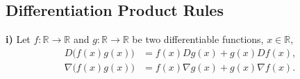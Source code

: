 \documentclass[12pt,thmsa]{article}
\begin{document}
\begin{itemize}
\end{itemize}


\subsection{Differentiation Product Rules}

\textbf{i)} Let \(f: \mathbb{R} \rightarrow \mathbb{R}\) and \(g: \mathbb{R} \rightarrow \mathbb{R}\) be two differentiable functions, \(x \in \mathbb{R}\),
\[ 
\begin{aligned}
	D \bigg (f(x) g(x) \bigg )
	& = f(x)  D g(x)
	+g(x)  D f(x),  \\
	\nabla \bigg (f(x) g(x) \bigg )
	& = f(x)  \nabla g(x)
	+g(x)  \nabla f(x). 
\end{aligned}
\]
\end{document}
